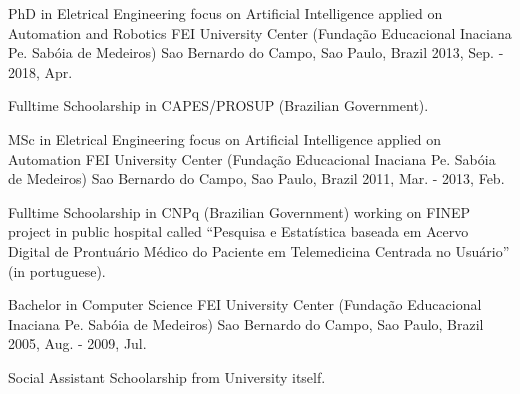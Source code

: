 

\begin{cventries}

  \cventry
    {PhD in Eletrical Engineering focus on Artificial Intelligence applied on Automation and Robotics}
    {FEI University Center (Fundação Educacional Inaciana Pe. Sabóia de Medeiros)} %
    {Sao Bernardo do Campo, Sao Paulo, Brazil} %
    {2013, Sep. - 2018, Apr.}
    {
      \begin{cvitems} %
        \item {Fulltime Schoolarship in CAPES/PROSUP (Brazilian Government).}
      \end{cvitems}
    }

  \cventry
    {MSc in Eletrical Engineering focus on Artificial Intelligence applied on Automation}
    {FEI University Center (Fundação Educacional Inaciana Pe. Sabóia de Medeiros)} %
    {Sao Bernardo do Campo, Sao Paulo, Brazil} %
    {2011, Mar. - 2013, Feb.}
    {
      \begin{cvitems} %
        \item {Fulltime Schoolarship in CNPq (Brazilian Government) working on FINEP project in public hospital called ``Pesquisa e Estatística baseada em Acervo Digital de Prontuário Médico do Paciente em Telemedicina Centrada no Usuário'' (in portuguese).}
      \end{cvitems}
    }

  \cventry
    {Bachelor in Computer Science} %
    {FEI University Center (Fundação Educacional Inaciana Pe. Sabóia de Medeiros)} %
    {Sao Bernardo do Campo, Sao Paulo, Brazil} %
    {2005, Aug. - 2009, Jul.} %
    {
        \begin{cvitems} %
          \item {Social Assistant Schoolarship from University itself.}
        \end{cvitems}
    }

\end{cventries}
